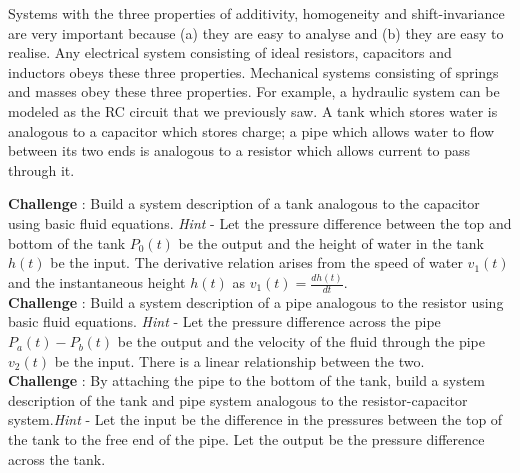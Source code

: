 Systems with the three properties of additivity, homogeneity and shift-invariance are very important because (a) they are easy to analyse and (b) they are easy to realise. Any electrical system consisting of ideal resistors, capacitors and inductors obeys these three properties. Mechanical systems consisting of springs and masses obey these three properties. For example, a hydraulic system can be modeled as the RC circuit that we previously saw. A tank which stores water is analogous to a capacitor which stores charge; a pipe which allows water to flow between its two ends is analogous to a resistor which allows current to pass through it. 

{\bf Challenge} : Build a system description of a tank analogous to the capacitor using basic fluid equations. 
\textit{Hint} - Let the pressure difference between the top and bottom of the tank $P_{0}(t)$ be the output and the height of water in the tank $h(t)$ be the input. The derivative relation arises from the speed of water $v_{1}(t)$ and the instantaneous height $h(t)$ as $v_{1}(t) = \frac{dh(t)}{dt}$.
\\

{\bf Challenge} : Build a system description of a pipe analogous to the resistor using basic fluid equations.
\textit{Hint} - Let the pressure difference across the pipe $P_{a}(t) - P_{b}(t)$ be the output and the velocity of the fluid through the pipe $v_{2}(t)$ be the input. There is a linear relationship between the two.
\\

{\bf Challenge} : By attaching the pipe to the bottom of the tank, build a system description of the tank and pipe system analogous to the resistor-capacitor system.\newline\textit{Hint} - Let the input be the difference in the pressures between the top of the tank to the free end of the pipe. Let the output be the pressure difference across the tank. 











